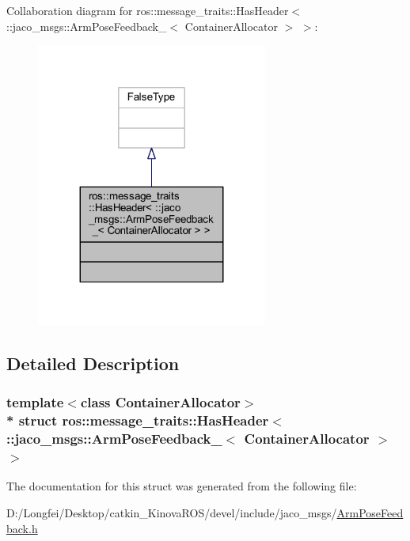 Collaboration diagram for ros\+:\+:message\+\_\+traits\+:\+:Has\+Header$<$ \+:\+:jaco\+\_\+msgs\+:\+:Arm\+Pose\+Feedback\+\_\+$<$ Container\+Allocator $>$ $>$\+:
\nopagebreak
\begin{figure}[H]
\begin{center}
\leavevmode
\includegraphics[width=215pt]{df/dd0/structros_1_1message__traits_1_1HasHeader_3_01_1_1jaco__msgs_1_1ArmPoseFeedback___3_01ContainerAllocator_01_4_01_4__coll__graph}
\end{center}
\end{figure}


\subsection{Detailed Description}
\subsubsection*{template$<$class Container\+Allocator$>$\\*
struct ros\+::message\+\_\+traits\+::\+Has\+Header$<$ \+::jaco\+\_\+msgs\+::\+Arm\+Pose\+Feedback\+\_\+$<$ Container\+Allocator $>$ $>$}



The documentation for this struct was generated from the following file\+:\begin{DoxyCompactItemize}
\item 
D\+:/\+Longfei/\+Desktop/catkin\+\_\+\+Kinova\+R\+O\+S/devel/include/jaco\+\_\+msgs/\hyperlink{ArmPoseFeedback_8h}{Arm\+Pose\+Feedback.\+h}\end{DoxyCompactItemize}
